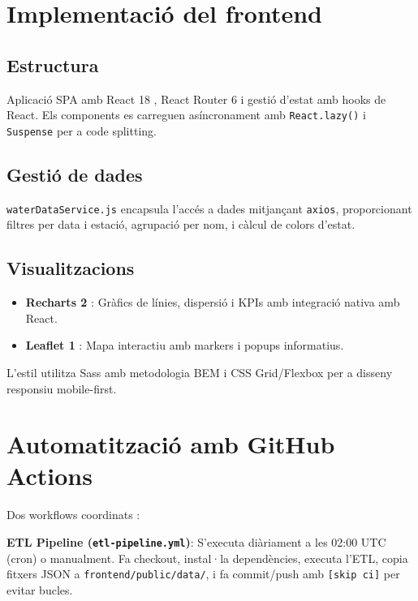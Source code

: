 \section{Implementació del frontend}

\subsection{Estructura}
Aplicació SPA amb React 18 \cite{react}, React Router 6 i gestió d'estat amb hooks de React. Els components es carreguen asíncronament amb \texttt{React.lazy()} i \texttt{Suspense} per a code splitting.

\subsection{Gestió de dades}
\texttt{waterDataService.js} encapsula l'accés a dades mitjançant \texttt{axios}, proporcionant filtres per data i estació, agrupació per nom, i càlcul de colors d'estat.

\subsection{Visualitzacions}
\begin{itemize}
    \item \textbf{Recharts 2} \cite{recharts}: Gràfics de línies, dispersió i KPIs amb integració nativa amb React.
    \item \textbf{Leaflet 1} \cite{leaflet}: Mapa interactiu amb markers i popups informatius.
\end{itemize}

L'estil utilitza Sass \cite{sass} amb metodologia BEM i CSS Grid/Flexbox per a disseny responsiu mobile-first.


\section{Automatització amb GitHub Actions}

Dos workflows coordinats \cite{github_actions}:

\textbf{ETL Pipeline (\texttt{etl-pipeline.yml})}: S'executa diàriament a les 02:00 UTC (cron) o manualment. Fa checkout, instal·la dependències, executa l'ETL, copia fitxers JSON a \texttt{frontend/public/data/}, i fa commit/push amb \texttt{[skip ci]} per evitar bucles.

